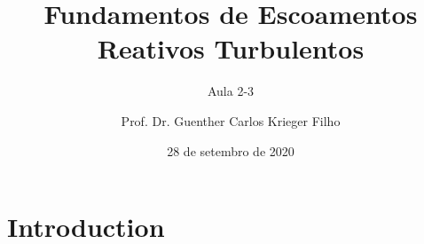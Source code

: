 \documentclass[10pt]{beamer}
\title{Fundamentos de Escoamentos Reativos Turbulentos}
\subtitle{Aula 2-3}
\date{28 de setembro de 2020}
\author{Prof. Dr. Guenther Carlos Krieger Filho}
\institute{Escola Politécnica da USP - LETE/CRC - Combustion Research Centre}
\begin{document}
\maketitle


\section{Introduction}
\end{document}
